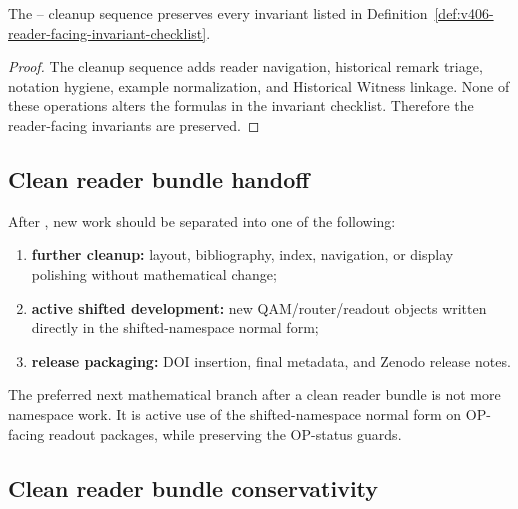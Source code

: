 \begin{lemma}
\label{lem:v406-cleanup-sequence-preserves-reader-facing-invariants}
The -- cleanup sequence preserves every invariant listed in
Definition~\ref{def:v406-reader-facing-invariant-checklist}.
\end{lemma}

\begin{proof}
The cleanup sequence adds reader navigation, historical remark triage, notation
hygiene, example normalization, and Historical Witness linkage. None of these
operations alters the formulas in the invariant checklist. Therefore the
reader-facing invariants are preserved.
\end{proof}

\subsection{Clean reader bundle handoff}
\label{subsec:v406-clean-reader-bundle-handoff}

\begin{definition}
\label{def:v406-clean-reader-bundle-handoff}
After , new work should be separated into one of the following:
\begin{enumerate}[leftmargin=*]
 \item \textbf{further cleanup:} layout, bibliography, index, navigation, or
 display polishing without mathematical change;
 \item \textbf{active shifted development:} new QAM/router/readout objects written
 directly in the shifted-namespace normal form;
 \item \textbf{release packaging:} DOI insertion, final metadata, and Zenodo
 release notes.
\end{enumerate}
\end{definition}

\begin{remark}
\label{rem:v406-preferred-next-mathematical-branch}
The preferred next mathematical branch after a clean reader bundle is not more
namespace work. It is active use of the shifted-namespace normal form on OP-facing readout
packages, while preserving the OP-status guards.
\end{remark}

\subsection{Clean reader bundle conservativity}
\label{subsec:v406-clean-reader-bundle-conservativity}

